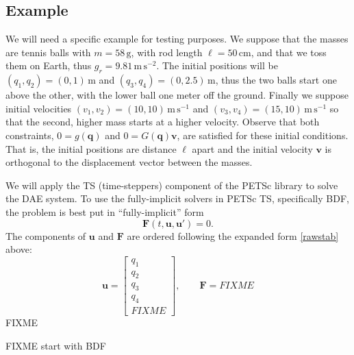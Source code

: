 \documentclass[letterpaper,final,12pt,reqno]{amsart}
\newcommand{\bq}{\mathbf{q}}
\newcommand{\bu}{\mathbf{u}}
\newcommand{\bv}{\mathbf{v}}
\newcommand{\bF}{\mathbf{F}}
\begin{document}
\subsection*{Example} We will need a specific example for testing purposes.  We suppose that the masses are tennis balls with $m=58\,\text{g}$, with rod length $\ell=50\,\text{cm}$, and that we toss them on Earth, thus $g_r=9.81\,\text{m}\,\text{s}^{-2}$.  The initial positions will be $(q_1,q_2)=(0,1)\,\text{m}$ and $(q_3,q_4)=(0,2.5)\,\text{m}$, thus the two balls start one above the other, with the lower ball one meter off the ground.  Finally we suppose initial velocities $(v_1,v_2)=(10,10)\,\text{m}\,\text{s}^{-1}$ and $(v_3,v_4)=(15,10)\,\text{m}\,\text{s}^{-1}$ so that the second, higher mass starts at a higher velocity.  Observe that both constraints, $0=g(\bq)$ and $0=G(\bq)\bv$, are satisfied for these initial conditions.  That is, the initial positions are distance $\ell$ apart and the initial velocity $\bv$ is orthogonal to the displacement vector between the masses.

\medskip
We will apply the TS (time-steppers) component of the PETSc library \cite{Balayetal2021,Bueler2021} to solve the DAE system.  To use the fully-implicit solvers in PETSc TS, specifically BDF, the problem is best put in ``fully-implicit'' form
\begin{equation}
\bF(t,\bu,\bu')=0. \label{fullyimplicit}
\end{equation}
The components of $\bu$ and $\bF$ are ordered following the expanded form \eqref{rawstab} above:
\begin{equation}
\bu = \begin{bmatrix} q_1 \\ q_2 \\ q_3 \\ q_4 \\ FIXME \end{bmatrix}, \qquad \bF = FIXME
\end{equation}
FIXME

FIXME start with BDF

\small

\bigskip


\end{document}
